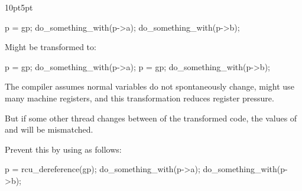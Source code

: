 \begin{listing}[tb]
\begin{adjustwidth}{10pt}{5pt}
\footnotesize
\renewcommand{\myfvline}{A\arabic{FancyVerbLine}}
\begin{fcvlabel}
\begin{VerbatimT}[commandchars=\\\[\]]
 p = gp;				\lnlbl[A1]
 do_something_with(p->a);		\lnlbl[A2]
 do_something_with(p->b);		\lnlbl[A3]
\end{VerbatimT}
Might be transformed to:
\renewcommand{\myfvline}{B\arabic{FancyVerbLine}}
\begin{VerbatimT}[commandchars=\\\[\]]
 p = gp;				\lnlbl[B1]
 do_something_with(p->a);		\lnlbl[B2]
 p = gp;				\lnlbl[B3]
 do_something_with(p->b);		\lnlbl[B4]
\end{VerbatimT}
The compiler assumes normal variables do not spontaneously change,
 might use many machine registers, and this
transformation reduces register pressure.
\begin{fcvref}
But if some other thread changes  between  of the
transformed code, the values of  and  will be mismatched.
\end{fcvref}
Prevent this by using  as follows:
\renewcommand{\myfvline}{C\arabic{FancyVerbLine}}
\begin{VerbatimT}[commandchars=\\\[\]]
 p = rcu_dereference(gp);		\lnlbl[C1]
 do_something_with(p->a);		\lnlbl[C2]
 do_something_with(p->b);		\lnlbl[C3]
\end{VerbatimT}
\end{fcvlabel}
\end{adjustwidth}
\caption{Compilers Can Reload Values}
\label{lst:defer:Compilers Can Reload Values}
\end{listing}

